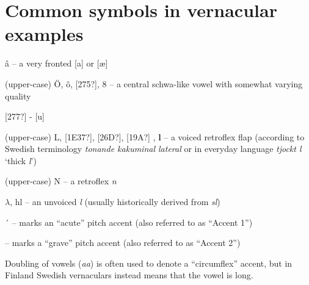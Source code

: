 ﻿
\chapter{Common symbols in vernacular examples}
\label{bkm:Ref224104485}

â – a very fronted [a] or [æ]

(upper-case) Ö, ô, [275?], \textsc{8  }\textsc{–}\textsc{ }a central schwa-like vowel with somewhat varying quality

[277?] - [u]

(upper-case) L, [1E37?], [26D?], [19A?] , \textbf{l }– a voiced retroflex flap (according to Swedish terminology \textit{tonande kakuminal lateral} or in everyday language \textit{tjockt l} ‘thick \textit{l}’)

(upper-case) N – a retroflex \textit{n}

$\lambda $, hl – an unvoiced \textit{l } (usually historically derived from \textit{sl})

´  – marks an “acute” pitch accent (also referred to as “Accent 1”)

{\textasciigrave} – marks a “grave” pitch accent (also referred to as “Accent 2”)

Doubling of vowels (\textit{aa}) is often used to denote a “circumflex” accent, but in Finland Swedish vernaculars instead means that the vowel is long.

